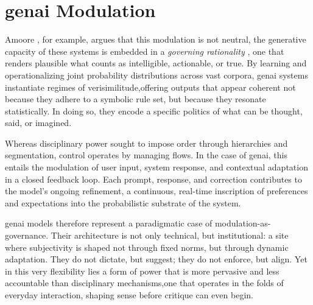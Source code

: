 \section{\Gls{genai} Modulation }



Amoore \parencite*{amoore2024}, for example, argues that this modulation is not neutral, the generative capacity of these systems is embedded in a \textit{governing rationality} \parencite{amoore2024}, one that renders plausible what counts as intelligible, actionable, or true. By learning and operationalizing joint probability distributions across vast corpora, \gls{genai} systems instantiate regimes of verisimilitude,offering outputs that appear coherent not because they adhere to a symbolic rule set, but because they resonate statistically. In doing so, they encode a specific politics of what can be thought, said, or imagined.

Whereas disciplinary power sought to impose order through hierarchies and segmentation, control operates by managing flows. In the case of \gls{genai}, this entails the modulation of user input, system response, and contextual adaptation in a closed feedback loop. Each prompt, response, and correction contributes to the model’s ongoing refinement, a continuous, real-time inscription of preferences and expectations into the probabilistic substrate of the system.

\Gls{genai} models therefore represent a paradigmatic case of modulation-as-governance. Their architecture is not only technical, but institutional: a site where subjectivity is shaped not through fixed norms, but through dynamic adaptation. They do not dictate, but suggest; they do not enforce, but align. Yet in this very flexibility lies a form of power that is more pervasive and less accountable than disciplinary mechanisms,one that operates in the folds of everyday interaction, shaping sense before critique can even begin.

